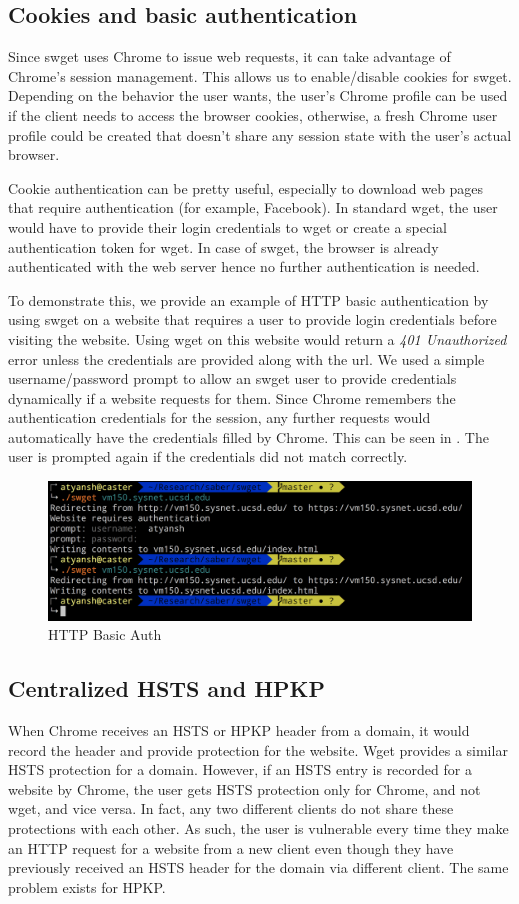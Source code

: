 \subsection{Cookies and basic authentication}
Since swget uses Chrome to issue web requests, it can take advantage of
Chrome's session management. This allows us to enable/disable cookies for
swget. Depending on the behavior the user wants, the user's Chrome profile can
be used if the client needs to access the browser cookies, otherwise, a fresh
Chrome user profile could be created that doesn't share any session state with
the user's actual browser.

Cookie authentication can be pretty useful, especially to download web pages
that require authentication (for example, Facebook). In standard wget, the user
would have to provide their login credentials to wget or create a special
authentication token for wget. In case of swget, the browser is already
authenticated with the web server hence no further authentication is needed.

To demonstrate this, we provide an example of HTTP basic authentication by
using swget on a website that requires a user to provide login credentials
before visiting the website. Using wget on this website would return a
\emph{401 Unauthorized} error unless the credentials are provided along with
the url. We used a simple username/password prompt to allow an swget user to
provide credentials dynamically if a website requests for them. Since Chrome
remembers the authentication credentials for the session, any further requests
would automatically have the credentials filled by Chrome. This can be seen in
. The user is prompted again if the credentials did
not match correctly.
\begin{figure}[h]
  \includegraphics[width=\textwidth]{figures/basic-auth}
  \caption{HTTP Basic Auth} 
  \label{fig:basic-auth-saber}
\end{figure}

\subsection{Centralized HSTS and HPKP}
When Chrome receives an HSTS or HPKP header from a domain, it would record the
header and provide protection for the website. Wget provides a similar HSTS
protection for a domain. However, if an HSTS entry is recorded for a website by
Chrome, the user gets HSTS protection only for Chrome, and not wget, and vice
versa. In fact, any two different clients do not share these protections with
each other. As such, the user is vulnerable every time they make an HTTP
request for a website from a new client even though they have previously
received an HSTS header for the domain via different client. The same
problem exists for HPKP.

